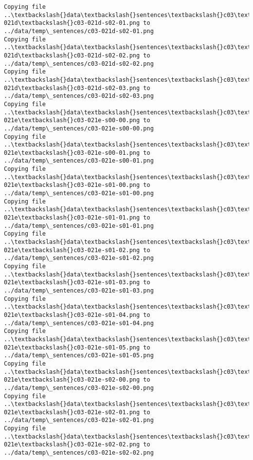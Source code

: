 \documentclass[11pt]{article}
\begin{document}
\begin{Verbatim}[commandchars=\\\{\}]
Copying file ..\textbackslash{}data\textbackslash{}sentences\textbackslash{}c03\textbackslash{}c03-021d\textbackslash{}c03-021d-s02-01.png to
../data/temp\_sentences/c03-021d-s02-01.png
Copying file ..\textbackslash{}data\textbackslash{}sentences\textbackslash{}c03\textbackslash{}c03-021d\textbackslash{}c03-021d-s02-02.png to
../data/temp\_sentences/c03-021d-s02-02.png
Copying file ..\textbackslash{}data\textbackslash{}sentences\textbackslash{}c03\textbackslash{}c03-021d\textbackslash{}c03-021d-s02-03.png to
../data/temp\_sentences/c03-021d-s02-03.png
Copying file ..\textbackslash{}data\textbackslash{}sentences\textbackslash{}c03\textbackslash{}c03-021e\textbackslash{}c03-021e-s00-00.png to
../data/temp\_sentences/c03-021e-s00-00.png
Copying file ..\textbackslash{}data\textbackslash{}sentences\textbackslash{}c03\textbackslash{}c03-021e\textbackslash{}c03-021e-s00-01.png to
../data/temp\_sentences/c03-021e-s00-01.png
Copying file ..\textbackslash{}data\textbackslash{}sentences\textbackslash{}c03\textbackslash{}c03-021e\textbackslash{}c03-021e-s01-00.png to
../data/temp\_sentences/c03-021e-s01-00.png
Copying file ..\textbackslash{}data\textbackslash{}sentences\textbackslash{}c03\textbackslash{}c03-021e\textbackslash{}c03-021e-s01-01.png to
../data/temp\_sentences/c03-021e-s01-01.png
Copying file ..\textbackslash{}data\textbackslash{}sentences\textbackslash{}c03\textbackslash{}c03-021e\textbackslash{}c03-021e-s01-02.png to
../data/temp\_sentences/c03-021e-s01-02.png
Copying file ..\textbackslash{}data\textbackslash{}sentences\textbackslash{}c03\textbackslash{}c03-021e\textbackslash{}c03-021e-s01-03.png to
../data/temp\_sentences/c03-021e-s01-03.png
Copying file ..\textbackslash{}data\textbackslash{}sentences\textbackslash{}c03\textbackslash{}c03-021e\textbackslash{}c03-021e-s01-04.png to
../data/temp\_sentences/c03-021e-s01-04.png
Copying file ..\textbackslash{}data\textbackslash{}sentences\textbackslash{}c03\textbackslash{}c03-021e\textbackslash{}c03-021e-s01-05.png to
../data/temp\_sentences/c03-021e-s01-05.png
Copying file ..\textbackslash{}data\textbackslash{}sentences\textbackslash{}c03\textbackslash{}c03-021e\textbackslash{}c03-021e-s02-00.png to
../data/temp\_sentences/c03-021e-s02-00.png
Copying file ..\textbackslash{}data\textbackslash{}sentences\textbackslash{}c03\textbackslash{}c03-021e\textbackslash{}c03-021e-s02-01.png to
../data/temp\_sentences/c03-021e-s02-01.png
Copying file ..\textbackslash{}data\textbackslash{}sentences\textbackslash{}c03\textbackslash{}c03-021e\textbackslash{}c03-021e-s02-02.png to
../data/temp\_sentences/c03-021e-s02-02.png

\end{Verbatim}
\end{document}

